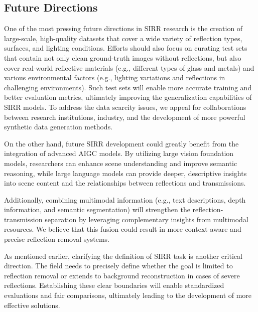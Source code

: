 \subsection{Future Directions}
One of the most pressing future directions in SIRR research is the creation of large-scale, high-quality datasets that cover a wide variety of reflection types, surfaces, and lighting conditions. Efforts should also focus on curating test sets that contain not only clean ground-truth images without reflections, but also cover real-world reflective materials (e.g., different types of glass and metals) and various environmental factors (e.g., lighting variations and reflections in challenging environments). Such test sets will enable more accurate training and better evaluation metrics, ultimately improving the generalization capabilities of SIRR models. To address the data scarcity issues, we appeal for collaborations between research institutions, industry, and the development of more powerful synthetic data generation methods.

On the other hand, future SIRR development could greatly benefit from the integration of advanced AIGC models. By utilizing large vision foundation models, researchers can enhance scene understanding and improve semantic reasoning, while large language models can provide deeper, descriptive insights into scene content and the relationships between reflections and transmissions.


Additionally, combining multimodal information (e.g., text descriptions, depth information, and semantic segmentation) will strengthen the reflection-transmission separation by leveraging complementary insights from multimodal resources. We believe that this fusion could result in more context-aware and precise reflection removal systems.

As mentioned earlier, clarifying the definition of SIRR task is another critical direction. The field needs to precisely define whether the goal is limited to reflection removal or extends to background reconstruction in cases of severe reflections. Establishing these clear boundaries will enable standardized evaluations and fair comparisons, ultimately leading to the development of more effective solutions.

